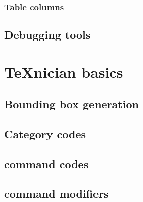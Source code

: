        \subsubsection{Table columns}
        \label{sec:tutorial/latex/custom/table}
        
        
    \subsection{Debugging tools}
    \label{sec:tutorial/latex/debug}
    

\newpage    
\section{\TeX{}nician basics}
\label{sec:tutorial/texnician}


    \subsection{Bounding box generation}
    \label{sec:tutorial/texnician/box}
    

    \subsection{Category codes}
    \label{sec:tutorial/texnician/code-cat}
    
    
    \subsection*{\thesubsection\hspace{1em}\Gls{command} codes}
    \label{sec:tutorial/texnician/code-cmd}
    
    
    \subsection*{\thesubsection\hspace{1em}\Gls{command} modifiers}
    \label{sec:tutorial/texnician/modif}
    
    
